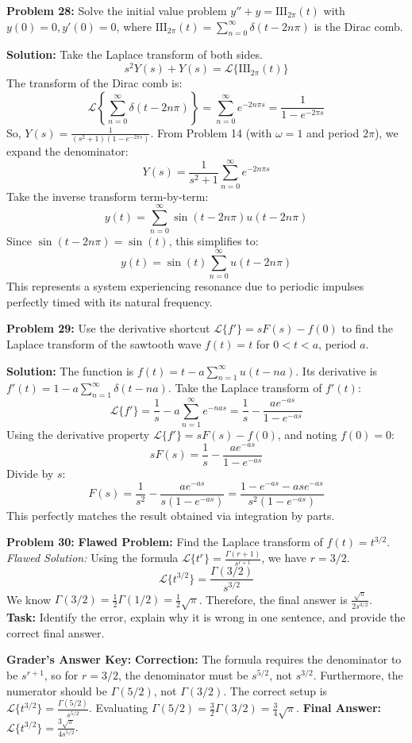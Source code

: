 \documentclass[11pt, letterpaper]{article}
\theoremstyle{definition}
\theoremstyle{remark}
\begin{document}
\vspace{1em}
\textbf{Problem 28:} Solve the initial value problem $y'' + y = \text{III}_{2\pi}(t)$ with $y(0) = 0, y'(0) = 0$, where $\text{III}_{2\pi}(t) = \sum_{n=0}^\infty \delta(t - 2n\pi)$ is the Dirac comb.

\textbf{Solution:}
Take the Laplace transform of both sides.
\[ s^2 Y(s) + Y(s) = \mathcal{L}\{\text{III}_{2\pi}(t)\} \]
The transform of the Dirac comb is:
\[ \mathcal{L} \left\{ \sum_{n=0}^\infty \delta(t - 2n\pi) \right\} = \sum_{n=0}^\infty e^{-2n\pi s} = \frac{1}{1 - e^{-2\pi s}} \]
So, $Y(s) = \frac{1}{(s^2 + 1)(1 - e^{-2\pi s})}$.
From Problem 14 (with $\omega = 1$ and period $2\pi$), we expand the denominator:
\[ Y(s) = \frac{1}{s^2 + 1} \sum_{n=0}^\infty e^{-2n\pi s} \]
Take the inverse transform term-by-term:
\[ y(t) = \sum_{n=0}^\infty \sin(t - 2n\pi) u(t - 2n\pi) \]
Since $\sin(t - 2n\pi) = \sin(t)$, this simplifies to:
\[ y(t) = \sin(t) \sum_{n=0}^\infty u(t - 2n\pi) \]
This represents a system experiencing resonance due to periodic impulses perfectly timed with its natural frequency.

\vspace{1em}
\textbf{Problem 29:} Use the derivative shortcut $\mathcal{L}\{f'\} = sF(s) - f(0)$ to find the Laplace transform of the sawtooth wave $f(t) = t$ for $0 < t < a$, period $a$.

\textbf{Solution:}
The function is $f(t) = t - a \sum_{n=1}^\infty u(t - na)$. Its derivative is $f'(t) = 1 - a \sum_{n=1}^\infty \delta(t - na)$.
Take the Laplace transform of $f'(t)$:
\[ \mathcal{L}\{f'\} = \frac{1}{s} - a \sum_{n=1}^\infty e^{-nas} = \frac{1}{s} - \frac{a e^{-as}}{1 - e^{-as}} \]
Using the derivative property $\mathcal{L}\{f'\} = sF(s) - f(0)$, and noting $f(0) = 0$:
\[ sF(s) = \frac{1}{s} - \frac{a e^{-as}}{1 - e^{-as}} \]
Divide by $s$:
\[ F(s) = \frac{1}{s^2} - \frac{a e^{-as}}{s(1 - e^{-as})} = \frac{1 - e^{-as} - as e^{-as}}{s^2(1 - e^{-as})} \]
This perfectly matches the result obtained via integration by parts.

\vspace{1em}
\textbf{Problem 30:} \textbf{Flawed Problem:} Find the Laplace transform of $f(t) = t^{3/2}$. \\
\textit{Flawed Solution:} Using the formula $\mathcal{L}\{t^r\} = \frac{\Gamma(r+1)}{s^{r+1}}$, we have $r = 3/2$.
\[ \mathcal{L}\{t^{3/2}\} = \frac{\Gamma(3/2)}{s^{3/2}} \]
We know $\Gamma(3/2) = \frac{1}{2}\Gamma(1/2) = \frac{1}{2}\sqrt{\pi}$. Therefore, the final answer is $\frac{\sqrt{\pi}}{2s^{3/2}}$. \\
\textbf{Task:} Identify the error, explain why it is wrong in one sentence, and provide the correct final answer.

\textbf{Grader's Answer Key:}
\textbf{Correction:} The formula requires the denominator to be $s^{r+1}$, so for $r = 3/2$, the denominator must be $s^{5/2}$, not $s^{3/2}$. Furthermore, the numerator should be $\Gamma(5/2)$, not $\Gamma(3/2)$.
The correct setup is $\mathcal{L}\{t^{3/2}\} = \frac{\Gamma(5/2)}{s^{5/2}}$.
Evaluating $\Gamma(5/2) = \frac{3}{2}\Gamma(3/2) = \frac{3}{4}\sqrt{\pi}$.
\textbf{Final Answer:} $\mathcal{L}\{t^{3/2}\} = \frac{3\sqrt{\pi}}{4s^{5/2}}$.
\end{document}
